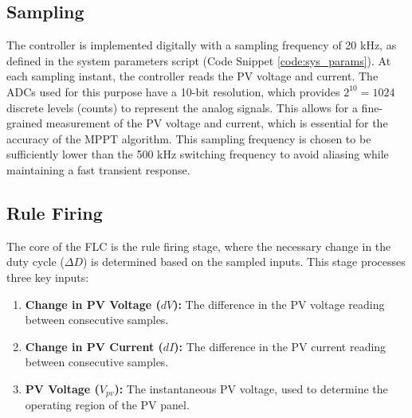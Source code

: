 \documentclass[a4paper,oneside,12pt]{report}
\numberwithin{equation}{chapter}
\begin{document}
\subsection{Sampling}
The controller is implemented digitally with a sampling frequency of 20 kHz, as defined in the system parameters script (Code Snippet \ref{code:sys_params}). At each sampling instant, the controller reads the PV voltage and current. The ADCs used for this purpose have a 10-bit resolution, which provides $2^{10} = 1024$ discrete levels (counts) to represent the analog signals. This allows for a fine-grained measurement of the PV voltage and current, which is essential for the accuracy of the MPPT algorithm. This sampling frequency is chosen to be sufficiently lower than the 500 kHz switching frequency to avoid aliasing while maintaining a fast transient response. 

\subsection{Rule Firing}
The core of the FLC is the rule firing stage, where the necessary change in the duty cycle ($\Delta D$) is determined based on the sampled inputs. This stage processes three key inputs:
\begin{enumerate}
    \item \textbf{Change in PV Voltage ($dV$):} The difference in the PV voltage reading between consecutive samples.
    \item \textbf{Change in PV Current ($dI$):} The difference in the PV current reading between consecutive samples.
    \item \textbf{PV Voltage ($V_{pv}$):} The instantaneous PV voltage, used to determine the operating region of the PV panel.
\end{enumerate}
\end{document}
